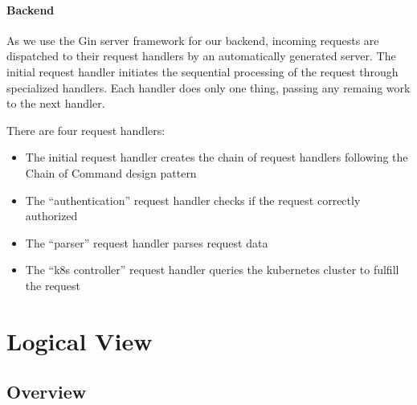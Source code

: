 \documentclass[a4paper,12pt,chapterprefix=false,bibliography=totoc,listof=totoc,]{scrreprt}
\begin{document}
\subsubsection{Backend}
As we use the Gin server framework for our backend, incoming requests are dispatched to their request handlers by an automatically generated server. The initial request handler initiates the sequential processing of the request through specialized handlers. Each handler does only one thing, passing any remaing work to the next handler.

There are four request handlers:
\begin{itemize}
	\item The initial request handler creates the chain of request handlers following the Chain of Command design pattern
	\item The \enquote{authentication} request handler checks if the request correctly authorized
	\item The \enquote{parser} request handler parses request data
	\item The \enquote{\gls{k8s} controller} request handler queries the kubernetes cluster to fulfill the request 
\end{itemize}

\chapter{Logical View}

\section{Overview}
\end{document}
